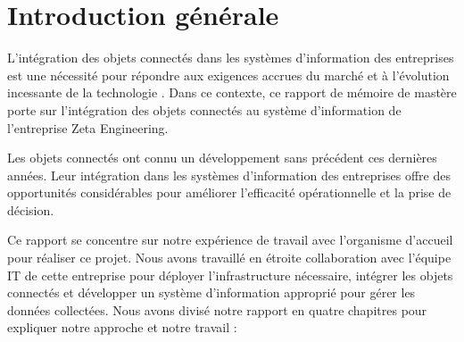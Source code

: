 \chapter*{Introduction générale}
\large {

\setlength{\parskip}{1em}
\setlength{\parindent}{1cm}

L'intégration des objets connectés dans les systèmes d’information des entreprises est une nécessité pour répondre aux exigences accrues du marché et à l’évolution incessante de la technologie \cite{antoine2019vers}. Dans ce contexte, ce rapport de mémoire de mastère porte sur l'intégration des objets connectés au système d’information de l’entreprise Zeta Engineering. 


Les objets connectés ont connu un développement sans précédent ces dernières années. Leur intégration dans les systèmes d'information des entreprises offre des opportunités considérables pour améliorer l'efficacité opérationnelle et la prise de décision.

Ce rapport se concentre sur notre expérience de travail avec l'organisme d'accueil pour réaliser ce projet. Nous avons travaillé en étroite collaboration avec l'équipe IT de cette entreprise pour déployer l'infrastructure nécessaire, intégrer les objets connectés et développer un système d'information approprié pour gérer les données collectées. Nous avons divisé notre rapport en quatre chapitres pour expliquer notre approche et notre travail :

}
